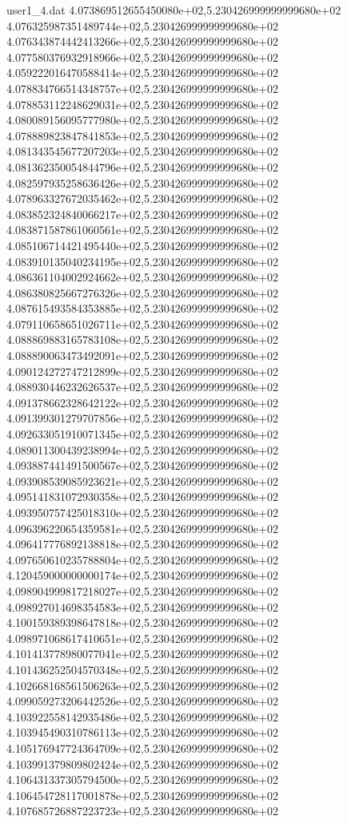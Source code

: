 \begin{filecontents}{user1_4.dat}
4.073869512655450080e+02,5.230426999999999680e+02
4.076325987351489744e+02,5.230426999999999680e+02
4.076343874442413266e+02,5.230426999999999680e+02
4.077580376932918966e+02,5.230426999999999680e+02
4.059222016470588414e+02,5.230426999999999680e+02
4.078834766514348757e+02,5.230426999999999680e+02
4.078853112248629031e+02,5.230426999999999680e+02
4.080089156095777980e+02,5.230426999999999680e+02
4.078889823847841853e+02,5.230426999999999680e+02
4.081343545677207203e+02,5.230426999999999680e+02
4.081362350054844796e+02,5.230426999999999680e+02
4.082597935258636426e+02,5.230426999999999680e+02
4.078963327672035462e+02,5.230426999999999680e+02
4.083852324840066217e+02,5.230426999999999680e+02
4.083871587861060561e+02,5.230426999999999680e+02
4.085106714421495440e+02,5.230426999999999680e+02
4.083910135040234195e+02,5.230426999999999680e+02
4.086361104002924662e+02,5.230426999999999680e+02
4.086380825667276326e+02,5.230426999999999680e+02
4.087615493584353885e+02,5.230426999999999680e+02
4.079110658651026711e+02,5.230426999999999680e+02
4.088869883165783108e+02,5.230426999999999680e+02
4.088890063473492091e+02,5.230426999999999680e+02
4.090124272747212899e+02,5.230426999999999680e+02
4.088930446232626537e+02,5.230426999999999680e+02
4.091378662328642122e+02,5.230426999999999680e+02
4.091399301279707856e+02,5.230426999999999680e+02
4.092633051910071345e+02,5.230426999999999680e+02
4.089011300439238994e+02,5.230426999999999680e+02
4.093887441491500567e+02,5.230426999999999680e+02
4.093908539085923621e+02,5.230426999999999680e+02
4.095141831072930358e+02,5.230426999999999680e+02
4.093950757425018310e+02,5.230426999999999680e+02
4.096396220654359581e+02,5.230426999999999680e+02
4.096417776892138818e+02,5.230426999999999680e+02
4.097650610235788804e+02,5.230426999999999680e+02
4.120459000000000174e+02,5.230426999999999680e+02
4.098904999817218027e+02,5.230426999999999680e+02
4.098927014698354583e+02,5.230426999999999680e+02
4.100159389398647818e+02,5.230426999999999680e+02
4.098971068617410651e+02,5.230426999999999680e+02
4.101413778980077041e+02,5.230426999999999680e+02
4.101436252504570348e+02,5.230426999999999680e+02
4.102668168561506263e+02,5.230426999999999680e+02
4.099059273206442526e+02,5.230426999999999680e+02
4.103922558142935486e+02,5.230426999999999680e+02
4.103945490310786113e+02,5.230426999999999680e+02
4.105176947724364709e+02,5.230426999999999680e+02
4.103991379809802424e+02,5.230426999999999680e+02
4.106431337305794500e+02,5.230426999999999680e+02
4.106454728117001878e+02,5.230426999999999680e+02
4.107685726887223723e+02,5.230426999999999680e+02

\end{filecontents}
